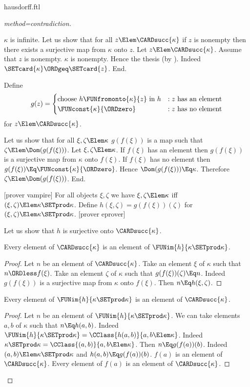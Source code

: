 \documentclass{stex}
\begin{document}
\begin{smodule}{hausdorff.ftl}
\begin{forthel}
\begin{proof}[method=contradiction]
\begin{case}{$\kappa$ is infinite.}
      Let us show that for all $z \Elem \CARDsucc{\kappa}$ if $z$ is nonempty then there exists a surjective map from $\kappa$ onto $z$.
        Let $z \Elem \CARDsucc{\kappa}$.
        Assume that $z$ is nonempty.
        $\kappa$ is nonempty.
        Hence the thesis (by ).
        Indeed $\SETcard{\kappa} \ORDgeq \SETcard{z}$.
      End.
  
      Define \[ g(z) =
        \begin{cases}
          \text{choose $h \FUNfromonto{\kappa}{z}$ in $h$}
          & : \text{$z$ has an element}
          \\
          \text{$\FUNconst{\kappa}{\ORDzero}$}
          & : \text{$z$ has no element}
        \end{cases}
      \] for $z \Elem \CARDsucc{\kappa}$.
  
      Let us show that for all $\xi, \zeta \Elem \kappa$ $g(f(\xi))$ is a map such that $\zeta \Elem \Dom(g(f(\xi)))$.
        Let $\xi, \zeta \Elem \kappa$.
        If $f(\xi)$ has an element then $g(f(\xi))$ is a surjective map from $\kappa$ onto $f(\xi)$.
        If $f(\xi)$ has no element then $g(f(\xi)) \Eq \FUNconst{\kappa}{\ORDzero}$.
        Hence $\Dom(g(f(\xi))) \Eq \kappa$.
        Therefore $\zeta \Elem \Dom(g(f(\xi)))$.
      End.
  
      [prover vampire]
      For all objects $\xi, \zeta$ we have $\xi, \zeta \Elem \kappa$ iff $(\xi, \zeta) \Elem \kappa \SETprod \kappa$.
      Define $h(\xi,\zeta) = g(f(\xi))(\zeta)$ for $(\xi,\zeta) \Elem \kappa \SETprod \kappa$.
      [prover eprover]

      Let us show that $h$ is surjective onto $\CARDsucc{\kappa}$.
  
        Every element of $\CARDsucc{\kappa}$ is an element of $\FUNim{h}{\kappa \SETprod \kappa}$.
        \begin{proof}
          Let $n$ be an element of $\CARDsucc{\kappa}$.
          Take an element $\xi$ of $\kappa$ such that $n \ORDless f(\xi)$.
          Take an element $\zeta$ of $\kappa$ such that $g(f(\xi))(\zeta) \Eq n$.
          Indeed $g(f(\xi))$ is a surjective map from $\kappa$ onto $f(\xi)$.
          Then $n \Eq h(\xi,\zeta)$.
        \end{proof}
  
        Every element of $\FUNim{h}{\kappa \SETprod \kappa}$ is an element of $\CARDsucc{\kappa}$.
        \begin{proof}
          Let $n$ be an element of $\FUNim{h}{\kappa \SETprod \kappa}$.
          We can take elements $a, b$ of $\kappa$ such that $n \Eq h(a,b)$.
          Indeed $\FUNim{h}{\kappa \SETprod \kappa} = \CClass{h(a,b)}{a,b \Elem \kappa}$.
          Indeed $\kappa \SETprod \kappa = \CClass{(a,b)}{a,b \Elem \kappa}$.
          Then $n \Eq g(f(a))(b)$.
          Indeed $(a,b) \Elem \kappa \SETprod \kappa$ and $h(a,b) \Eq g(f(a))(b)$.
          $f(a)$ is an element of $\CARDsucc{\kappa}$.
          Every element of $f(a)$ is an element of $\CARDsucc{\kappa}$.
  

\end{proof}
\end{case}
\end{proof}
\end{forthel}
\end{smodule}
\end{document}
